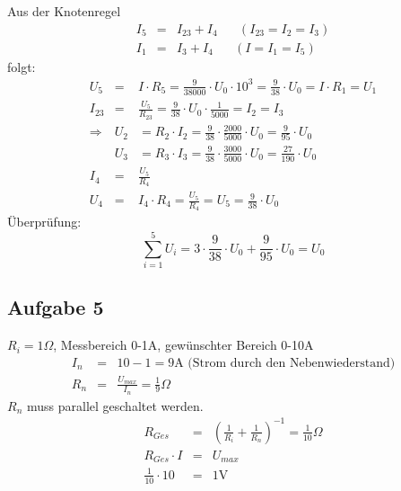 \documentclass[12pt,a4paper]{article}
\begin{document}
Aus der Knotenregel
\begin{eqnarray*}
I_5 & = & I_{23} + I_4 \hspace{20pt} ( I_{23} = I_2 = I_3 ) \\
I_1 & = & I_3 + I_4 \hspace{20pt} ( I = I_1 = I_5 )
\end{eqnarray*}
folgt:
\begin{eqnarray*}
U_5 & = & I \cdot R_5 = \frac{9}{38000} \cdot U_0 \cdot 10^3 = \frac{9}{38} \cdot U_0 = I \cdot R_1 = U_1 \\
I_{23} & = & \frac{U_5}{R_{23}} = \frac{9}{38} \cdot U_0 \cdot \frac{1}{5000} = I_2 = I_3 \\
\Rightarrow & U_2 & = R_2 \cdot I_2 = \frac{9}{38} \cdot \frac{2000}{5000} \cdot U_0 = \frac{9}{95} \cdot U_0 \\
& U_3 & = R_3 \cdot I_3 = \frac{9}{38} \cdot \frac{3000}{5000} \cdot U_0 = \frac{27}{190} \cdot U_0 \\
I_4 & = & \frac{U_5}{R_4} \\
U_4 & = & I_4 \cdot R_4 = \frac{U_5}{R_4} = U_5 = \frac{9}{38} \cdot U_0
\end{eqnarray*}
\"Uberpr\"ufung:
\[ \sum_{i=1}^5 U_i = 3 \cdot \frac{9}{38} \cdot U_0 + \frac{9}{95} \cdot U_0 = U_0 \]

\subsection*{Aufgabe 5}
$R_i = 1\Omega$, Messbereich 0-1A, gew\"unschter Bereich 0-10A
\begin{eqnarray*}
I_n & = & 10 - 1 = 9\mbox{A (Strom durch den Nebenwiederstand)} \\
R_n & = & \frac{U_{max}}{I_n} = \frac{1}{9}  \Omega
\end{eqnarray*}
$R_n$ muss parallel geschaltet werden.
\begin{eqnarray*}
R_{Ges} & = & \left( \frac{1}{R_i} + \frac{1}{R_n} \right) ^{-1} = \frac{1}{10}\Omega \\
R_{Ges} \cdot I & = & U_{max} \\
\frac{1}{10} \cdot 10 & = & 1 \mbox{V}
\end{eqnarray*}
\end{document}
